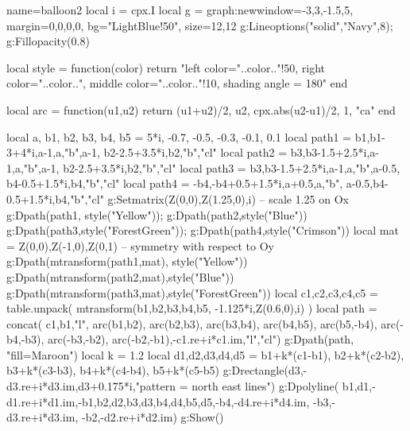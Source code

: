 \documentclass[border=5pt]{standalone}
\begin{document}
\begin{luadraw}{name=balloon2}
local i = cpx.I
local g = graph:new{window={-3,3,-1.5,5}, margin={0,0,0,0}, bg="LightBlue!50", size={12,12}}
g:Lineoptions("solid","Navy",8); g:Fillopacity(0.8)

local style = function(color)
    return "left color="..color.."!50, right color="..color..", middle color="..color.."!10, shading angle = 180"
end

local arc = function(u1,u2)
    return {(u1+u2)/2, u2, cpx.abs(u2-u1)/2, 1, "ca"}
end

local a, b1, b2, b3, b4, b5 = 5*i, -0.7, -0.5, -0.3, -0.1, 0.1
local path1 = {b1,b1-3+4*i,a-1,a,"b",a-1, b2-2.5+3.5*i,b2,"b","cl"}
local path2 = {b3,b3-1.5+2.5*i,a-1,a,"b",a-1, b2-2.5+3.5*i,b2,"b","cl"}
local path3 = {b3,b3-1.5+2.5*i,a-1,a,"b",a-0.5, b4-0.5+1.5*i,b4,"b","cl"}
local path4 = {-b4,-b4+0.5+1.5*i,a+0.5,a,"b", a-0.5,b4-0.5+1.5*i,b4,"b","cl"}
g:Setmatrix({Z(0,0),Z(1.25,0),i}) -- scale 1.25 on Ox
g:Dpath(path1, style("Yellow")); g:Dpath(path2,style("Blue"))
g:Dpath(path3,style("ForestGreen")); g:Dpath(path4,style("Crimson"))
local mat = {Z(0,0),Z(-1,0),Z(0,1)} -- symmetry with respect to Oy
g:Dpath(mtransform(path1,mat), style("Yellow"))
g:Dpath(mtransform(path2,mat),style("Blue"))
g:Dpath(mtransform(path3,mat),style("ForestGreen"))
local c1,c2,c3,c4,c5 = table.unpack( mtransform({b1,b2,b3,b4,b5}, {-1.125*i,Z(0.6,0),i}) )
local path = concat( {c1,b1,"l"}, arc(b1,b2), arc(b2,b3), arc(b3,b4), arc(b4,b5), arc(b5,-b4), arc(-b4,-b3), arc(-b3,-b2), arc(-b2,-b1),{-c1.re+i*c1.im,"l","cl"})
g:Dpath(path, "fill=Maroon")
local k = 1.2
local d1,d2,d3,d4,d5 = b1+k*(c1-b1), b2+k*(c2-b2), b3+k*(c3-b3), b4+k*(c4-b4), b5+k*(c5-b5)
g:Drectangle(d3,-d3.re+i*d3.im,d3+0.175*i,"pattern = north east lines")
g:Dpolyline( {{b1,d1,-d1.re+i*d1.im,-b1},{b2,d2},{b3,d3},{b4,d4},{b5,d5},{-b4,-d4.re+i*d4.im}, {-b3,-d3.re+i*d3.im}, {-b2,-d2.re+i*d2.im}})
g:Show()
\end{luadraw}
\end{document}
